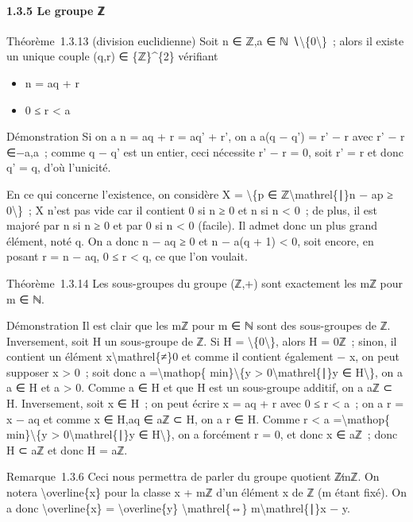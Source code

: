 \documentclass[]{article}
\begin{document}
\paragraph{1.3.5 Le groupe ℤ}

Théorème~1.3.13 (division euclidienne) Soit n ∈ ℤ,a ∈ ℕ
∖\textbackslash{}\{0\textbackslash{}\}~; alors il existe un unique
couple (q,r) ∈ \{ℤ\}\^{}\{2\} vérifiant

\begin{itemize}
\itemsep1pt\parskip0pt
\item
  n = aq + r
\item
  0 ≤ r \textless{} a
\end{itemize}

Démonstration Si on a n = aq + r = aq' + r', on a a(q − q') = r' − r
avec r' − r ∈−a,a~; comme q − q' est un entier, ceci nécessite r' − r =
0, soit r' = r et donc q' = q, d'où l'unicité.

En ce qui concerne l'existence, on considère X = \textbackslash{}\{p ∈
ℤ\textbackslash{}mathrel\{∣\}n − ap ≥ 0\textbackslash{}\}~; X n'est pas
vide car il contient 0 si n ≥ 0 et n si n \textless{} 0~; de plus, il
est majoré par n si n ≥ 0 et par 0 si n \textless{} 0 (facile). Il admet
donc un plus grand élément, noté q. On a donc n − aq ≥ 0 et n − a(q + 1)
\textless{} 0, soit encore, en posant r = n − aq, 0 ≤ r \textless{} q,
ce que l'on voulait.

Théorème~1.3.14 Les sous-groupes du groupe (ℤ,+) sont exactement les mℤ
pour m ∈ ℕ.

Démonstration Il est clair que les mℤ pour m ∈ ℕ sont des sous-groupes
de ℤ. Inversement, soit H un sous-groupe de ℤ. Si H =
\textbackslash{}\{0\textbackslash{}\}, alors H = 0ℤ~; sinon, il contient
un élément x\textbackslash{}mathrel\{≠\}0 et comme il contient également
− x, on peut supposer x \textgreater{} 0~; soit donc a
=\textbackslash{}mathop\{ min\}\textbackslash{}\{y \textgreater{}
0\textbackslash{}mathrel\{∣\}y ∈ H\textbackslash{}\}, on a a ∈ H et a
\textgreater{} 0. Comme a ∈ H et que H est un sous-groupe additif, on a
aℤ ⊂ H. Inversement, soit x ∈ H~; on peut écrire x = aq + r avec 0 ≤ r
\textless{} a~; on a r = x − aq et comme x ∈ H,aq ∈ aℤ ⊂ H, on a r ∈ H.
Comme r \textless{} a =\textbackslash{}mathop\{ min\}\textbackslash{}\{y
\textgreater{} 0\textbackslash{}mathrel\{∣\}y ∈ H\textbackslash{}\}, on
a forcément r = 0, et donc x ∈ aℤ~; donc H ⊂ aℤ et donc H = aℤ.

Remarque~1.3.6 Ceci nous permettra de parler du groupe quotient ℤ∕mℤ. On
notera \textbackslash{}overline\{x\} pour la classe x + mℤ d'un élément
x de ℤ (m étant fixé). On a donc \textbackslash{}overline\{x\} =
\textbackslash{}overline\{y\} \textbackslash{}mathrel\{⇔\}
m\textbackslash{}mathrel\{∣\}x − y.
\end{document}
